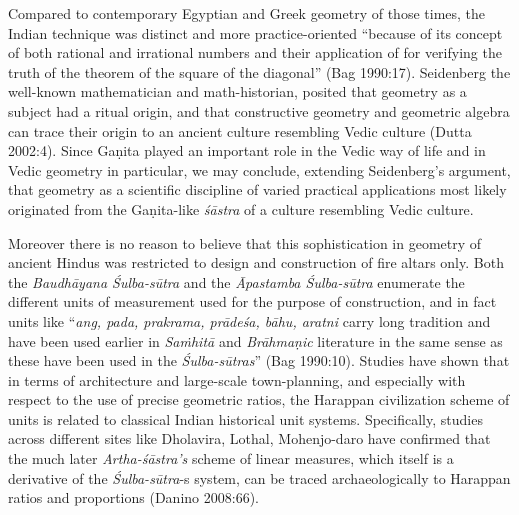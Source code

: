 Compared to contemporary Egyptian and Greek geometry of those times, the Indian technique was distinct and more practice-oriented ``because of its concept of both rational and irrational numbers and their application of for verifying the truth of the theorem of the square of the diagonal'' (Bag 1990:17). Seidenberg the well-known mathematician and math-historian,  posited that geometry as a subject had a ritual origin, and that constructive geometry and geometric algebra can trace their origin to an ancient culture resembling Vedic culture (Dutta 2002:4). Since Gaṇita played an important role in the Vedic way of life and in Vedic geometry in particular, we may conclude, extending Seidenberg’s argument, that geometry as a scientific discipline of varied practical applications most likely originated from the Gaṇita-like {\sl śāstra} of a culture resembling Vedic culture.

Moreover there is no reason to believe that this sophistication in geometry of ancient Hindus was restricted to design and construction of fire altars only. Both the {\sl Baudhāyana Śulba-sūtra} and the {\sl Āpastamba Śulba-sūtra} enumerate the different units of measurement used for the purpose of construction, and in fact units like ``{\sl ang, pada, prakrama, prādeśa, bāhu, aratni} carry long tradition and have been used earlier in {\sl Saṁhitā} and {\sl Brāhmaṇic} literature in the same sense as these have been used in the {\sl Śulba-sūtras}'' (Bag 1990:10). Studies have shown that in terms of architecture and large-scale town-planning, and especially with respect to the use of precise geometric ratios, the Harappan civilization scheme of units is related to classical Indian historical unit systems. Specifically, studies across different sites like Dholavira, Lothal, Mohenjo-daro have confirmed that the much later {\sl Artha-śāstra’s} scheme of linear measures, which itself is a derivative of the {\sl Śulba-sūtra}-s system, can be traced archaeologically to Harappan ratios and proportions (Danino 2008:66).


